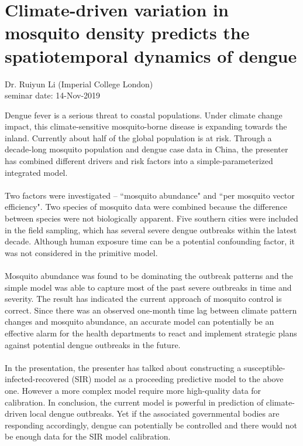 \documentclass{article}
\begin{document}
    \section{Climate-driven variation in mosquito density predicts the spatiotemporal dynamics of dengue}
    \begin{flushright}
        \large{Dr. Ruiyun Li (Imperial College London)}\\
        seminar date: 14-Nov-2019
    \end{flushright}
    Dengue fever is a serious threat to coastal populations.  Under climate change impact, this climate-sensitive mosquito-borne disease is expanding towards the inland.  Currently about half of the global population is at risk.  Through a decade-long mosquito population and dengue case data in China, the presenter has combined different drivers and risk factors into a simple-parameterized integrated model.\\\\
    Two factors were investigated -- ``mosquito abundance" and ``per mosquito vector efficiency".  Two species of mosquito data were combined because the difference between species were not biologically apparent.  Five southern cities were included in the field sampling, which has several severe dengue outbreaks within the latest decade.  Although human exposure time can be a potential confounding factor, it was not considered in the primitive model.\\\\
    Mosquito abundance was found to be dominating the outbreak patterns and the simple model was able to capture most of the past severe outbreaks in time and severity.  The result has indicated the current approach of mosquito control is correct.  Since there was an observed one-month time lag between climate pattern changes and mosquito abundance, an accurate model can potentially be an effective alarm for the health departments to react and implement strategic plans against potential dengue outbreaks in the future.\\\\
    In the presentation, the presenter has talked about constructing a susceptible-infected-recovered (SIR) model as a proceeding predictive model to the above one.  However a more complex model require more high-quality data for calibration.  In conclusion, the current model is powerful in prediction of climate-driven local dengue outbreaks.  Yet if the associated governmental bodies are responding accordingly, dengue can potentially be controlled and there would not be enough data for the SIR model calibration.
    \clearpage
    
\end{document}
